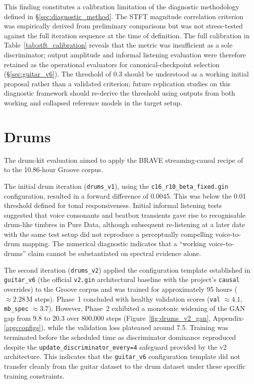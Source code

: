 \documentclass[a4paper,11pt,oneside,openany]{book}
\begin{document}
This finding constitutes a calibration limitation of the diagnostic methodology defined in \S\ref{sec:diagnostic_method}. The STFT magnitude correlation criterion was empirically derived from preliminary comparisons but was not stress-tested against the full iteration sequence at the time of definition. The full calibration in Table~\ref{tab:stft_calibration} reveals that the metric was insufficient as a sole discriminator; output amplitude and informal listening evaluation were therefore retained as the operational evaluators for canonical-checkpoint selection (\S\ref{sec:guitar_v6}). The threshold of 0.3 should be understood as a working initial proposal rather than a validated criterion; future replication studies on this diagnostic framework should re-derive the threshold using outputs from both working and collapsed reference models in the target setup.

\section{Drums}\label{sec:drums}

The drum-kit evaluation aimed to apply the BRAVE streaming-causal recipe of \textcite{caspe2025brave} to the 10.86-hour Groove corpus.

The initial drum iteration (\texttt{drums\_v1}), using the \texttt{c16\_r10\_beta\_fixed.gin} configuration, resulted in a forward difference of 0.0045. This was below the 0.01 threshold defined for tonal responsiveness. Initial informal listening tests suggested that voice consonants and beatbox transients gave rise to recognisable drum-like timbres in Pure Data, although subsequent re-listening at a later date with the same test setup did not reproduce a perceptually compelling voice-to-drum mapping. The numerical diagnostic indicates that a ``working voice-to-drums'' claim cannot be substantiated on spectral evidence alone.

The second iteration (\texttt{drums\_v2}) applied the configuration template established in \texttt{guitar\_v6} (the official \texttt{v2.gin} architectural baseline with the project's \texttt{causal} overrides) to the Groove corpus and was trained for approximately 95 hours ($\approx 2.28$\,M steps). Phase~1 concluded with healthy validation scores (\texttt{val} $\approx 4.1$, \texttt{mb\_spec} $\approx 3.7$). However, Phase~2 exhibited a monotonic widening of the GAN gap from 9.8 to 20.3 over 800,000 steps (Figure~\ref{fig:drums_v2_gan}, Appendix-\ref{app:configs}), while the validation loss plateaued around 7.5. Training was terminated before the scheduled time as discriminator dominance reproduced despite the \texttt{update\_discriminator\_every=4} safeguard provided by the v2 architecture. This indicates that the \texttt{guitar\_v6} configuration template did not transfer cleanly from the guitar dataset to the drum dataset under these specific training constraints.
\end{document}
